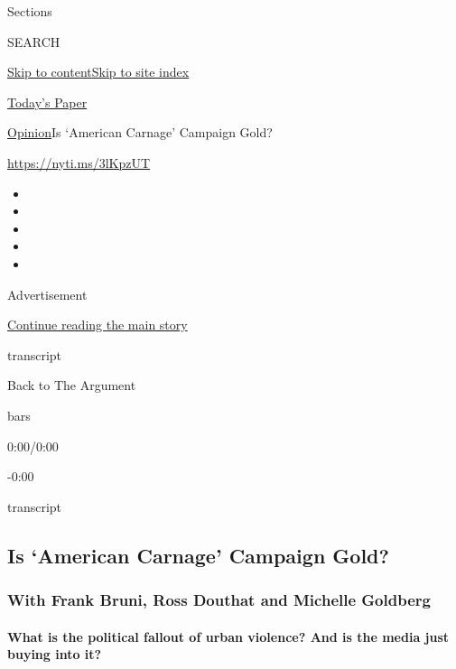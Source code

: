 Sections

SEARCH

\protect\hyperlink{site-content}{Skip to
content}\protect\hyperlink{site-index}{Skip to site index}

\href{https://myaccount.nytimes3xbfgragh.onion/auth/login?response_type=cookie\&client_id=vi}{}

\href{https://www.nytimes3xbfgragh.onion/section/todayspaper}{Today's
Paper}

\href{/section/opinion}{Opinion}\textbar{}Is `American Carnage' Campaign
Gold?

\url{https://nyti.ms/3lKpzUT}

\begin{itemize}
\item
\item
\item
\item
\item
\end{itemize}

Advertisement

\protect\hyperlink{after-top}{Continue reading the main story}

transcript

Back to The Argument

bars

0:00/0:00

-0:00

transcript

\hypertarget{is-american-carnage-campaign-gold}{%
\subsection{Is `American Carnage' Campaign
Gold?}\label{is-american-carnage-campaign-gold}}

\hypertarget{with-frank-bruni-ross-douthat-and-michelle-goldberg}{%
\subsubsection{With Frank Bruni, Ross Douthat and Michelle
Goldberg}\label{with-frank-bruni-ross-douthat-and-michelle-goldberg}}

\hypertarget{what-is-the-political-fallout-of-urban-violence-and-is-the-media-just-buying-into-it}{%
\paragraph{What is the political fallout of urban violence? And is the
media just buying into
it?}\label{what-is-the-political-fallout-of-urban-violence-and-is-the-media-just-buying-into-it}}

